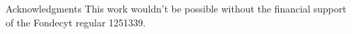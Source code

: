 \begin{block}{Acknowledgments}
    This work wouldn't be possible without the financial support of the Fondecyt regular 1251339.
\vspace{3ex}
\end{block}